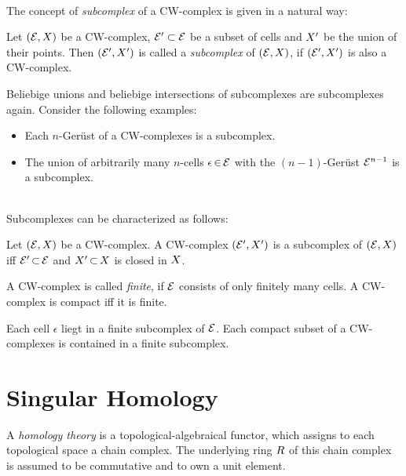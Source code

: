 \documentclass[11pt,twoside]{article}
\begin{document}
\paragraph{}
The concept of \textit{subcomplex} of a CW-complex is given in a natural way:

\begin{definition} %
Let $(\cal{E},\topX)$ be a CW-complex,
$\cal{E}' \subset \cal{E}$ be a subset of cells
and $\topX'$ be the union of their points.
Then $(\cal{E}',\topX')$ is called a \textit{subcomplex} of $(\cal{E},\topX)$,
if $(\cal{E}',\topX')$ is also a CW-complex.
\end{definition}

\subparagraph{}
Beliebige unions and beliebige intersections of subcomplexes are
subcomplexes again.
Consider the following examples:

\begin{itemize}[leftmargin=22pt]
\item[1.]
Each $n$-Ger\"ust of a CW-complexes is a subcomplex.

\item[2.]
The union of arbitrarily many $n$-cells $\epsilon \xeof \cal{E}$
with the $(n-1)$-Ger\"ust $\cal{E}^{n-1}$ is a subcomplex.
\end{itemize}

\paragraph{}
Subcomplexes can be characterized as follows:

\begin{theorem1}
Let $(\cal{E},\topX)$ be a CW-complex.
A CW-complex $(\cal{E}',\topX')$ is a subcomplex of $(\cal{E},\topX)$
iff $\cal{E}' \xsubset \cal{E}$ and $\topX' \xsubset \topX$ is closed in $\topX$.
\end{theorem1}

\subparagraph{}
A CW-complex is called \textit{finite},
if $\cal{E}$ consists of only finitely many cells.
A CW-complex is compact iff it is finite.

\subparagraph{}
Each cell $\epsilon$ liegt in a finite subcomplex of $\cal{E}$.
Each compact subset of a CW-complexes is contained in a finite subcomplex.

\part{Singular Homology}
A \textit{homology theory} is a topological-algebraical functor,
which assigns to each topological space a chain complex.
The underlying ring $\riR$ of this chain complex is assumed to be
commutative and to own a unit element.
\end{document}
